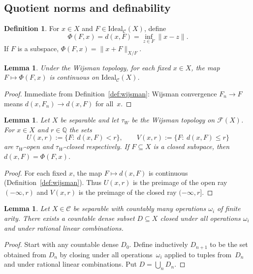 \documentclass[12pt,fleqn,a4paper]{amsart}
\renewcommand{\le}{\leqslant}
\numberwithin{equation}{section}
\newtheorem{lemma}[theorem]{Lemma}
\theoremstyle{definition}
\newtheorem{definition}[theorem]{Definition}
\newcommand{\Q}{\mathbb{Q}}
\newcommand{\Ideal}{\mathrm{Ideal}}
\begin{document}
\subsection{Quotient norms and definability}

\begin{definition}\label{def:Phi}
For $x\in X$ and $F\in\Ideal_{\mathcal C}(X)$, define
\[
\Phi(F,x)=d(x,F)=\inf_{z\in F}\|x-z\|.
\]
If $F$ is a subspace, $\Phi(F,x)=\|x+F\|_{X/F}$.
\end{definition}

\begin{lemma}\label{lem:Phi-continuous}
Under the Wijsman topology, for each fixed $x\in X$, the map
$F\mapsto \Phi(F,x)$ is continuous on $\Ideal_{\mathcal C}(X)$.
\end{lemma}

\begin{proof}
Immediate from Definition~\ref{def:wijsman}: Wijsman convergence
$F_n\to F$ means $d(x,F_n)\to d(x,F)$ for all~$x$.
\end{proof}

\begin{lemma}\label{lem:wijsman-subbasic}
Let $X$ be separable and let $\tau_W$ be the Wijsman topology on $\mathscr F(X)$.
For $x\in X$ and $r\in\Q$ the sets
\[
U(x,r):=\{F:\ d(x,F)<r\},\qquad
V(x,r):=\{F:\ d(x,F)\le r\}
\]
are $\tau_W$-open and $\tau_W$-closed respectively.
If $F\subseteq X$ is a closed subspace, then $d(x,F)=\Phi(F,x)$.
\end{lemma}

\begin{proof}
For each fixed $x$, the map $F\mapsto d(x,F)$ is continuous (Definition~\ref{def:wijsman}).
Thus $U(x,r)$ is the preimage of the open ray $(-\infty,r)$ and $V(x,r)$ is the
preimage of the closed ray $(-\infty,r]$.
\end{proof}

\begin{lemma}\label{lem:dense-op-closed}
Let $X\in\mathcal C$ be separable with countably many
operations $\omega_i$ of finite arity.  There exists a countable dense subset
$D\subseteq X$ closed under all operations $\omega_i$ and under rational
linear combinations.
\end{lemma}

\begin{proof}
Start with any countable dense $D_0$.  Define inductively $D_{n+1}$ to be the
set obtained from $D_n$ by closing under all operations~$\omega_i$ applied to tuples
from~$D_n$ and under rational linear combinations.  Put $D=\bigcup_n D_n$.
\end{proof}
\end{document}
